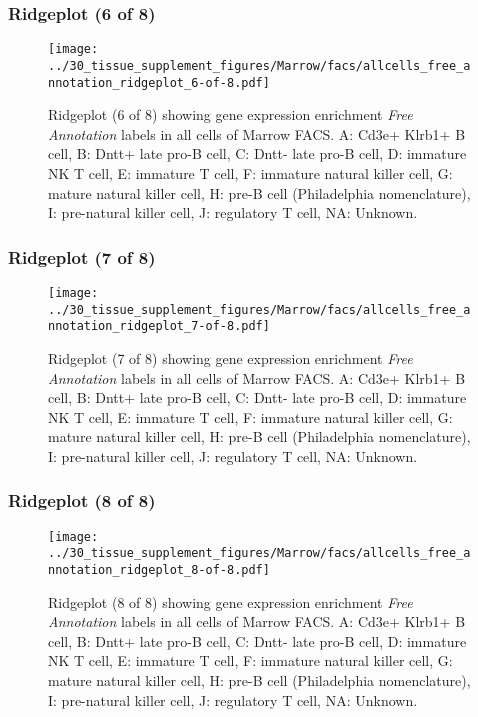 \clearpage

\subsubsection{Ridgeplot (6 of 8)}
\begin{figure}[h]
\centering
\texttt{[image: ../30\_tissue\_supplement\_figures/Marrow/facs/allcells\_free\_annotation\_ridgeplot\_6-of-8.pdf]}

\caption{ Ridgeplot (6 of 8)  showing gene expression enrichment \emph{Free Annotation} labels in all cells of Marrow FACS. A: Cd3e+ Klrb1+ B cell, B: Dntt+ late pro-B cell, C: Dntt- late pro-B cell, D: immature NK T cell, E: immature T cell, F: immature natural killer cell, G: mature natural killer cell, H: pre-B cell (Philadelphia nomenclature), I: pre-natural killer cell, J: regulatory T cell, NA: Unknown.}
\end{figure}


\clearpage

\subsubsection{Ridgeplot (7 of 8)}
\begin{figure}[h]
\centering
\texttt{[image: ../30\_tissue\_supplement\_figures/Marrow/facs/allcells\_free\_annotation\_ridgeplot\_7-of-8.pdf]}

\caption{ Ridgeplot (7 of 8)  showing gene expression enrichment \emph{Free Annotation} labels in all cells of Marrow FACS. A: Cd3e+ Klrb1+ B cell, B: Dntt+ late pro-B cell, C: Dntt- late pro-B cell, D: immature NK T cell, E: immature T cell, F: immature natural killer cell, G: mature natural killer cell, H: pre-B cell (Philadelphia nomenclature), I: pre-natural killer cell, J: regulatory T cell, NA: Unknown.}
\end{figure}


\clearpage

\subsubsection{Ridgeplot (8 of 8)}
\begin{figure}[h]
\centering
\texttt{[image: ../30\_tissue\_supplement\_figures/Marrow/facs/allcells\_free\_annotation\_ridgeplot\_8-of-8.pdf]}

\caption{ Ridgeplot (8 of 8)  showing gene expression enrichment \emph{Free Annotation} labels in all cells of Marrow FACS. A: Cd3e+ Klrb1+ B cell, B: Dntt+ late pro-B cell, C: Dntt- late pro-B cell, D: immature NK T cell, E: immature T cell, F: immature natural killer cell, G: mature natural killer cell, H: pre-B cell (Philadelphia nomenclature), I: pre-natural killer cell, J: regulatory T cell, NA: Unknown.}
\end{figure}


